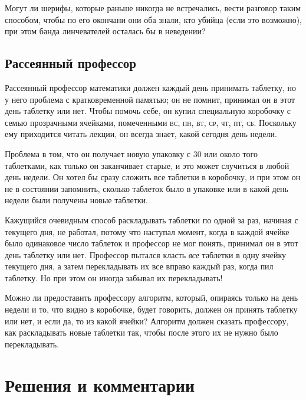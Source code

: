 \documentclass[twoside]{book}
\makeatletter
\newcommand{\rindex}[2][\imki@jobname]{%
  \index[#1]{\detokenize{#2}}%
}
\makeatother
\begin{document}
Могут ли шерифы, которые раньше никогда не встречались, вести разговор таким способом, чтобы по его окончани они оба знали, кто убийца (если это возможно),  при этом банда линчевателей осталась бы в неведении?

\subsection*{Рассеянный профессор}%
\rindex{Рассеянный профессор}

Рассеянный профессор математики должен каждый день принимать таблетку, но у него проблема с кратковременной памятью; он не помнит, принимал  он в этот день таблетку или нет.
Чтобы помочь себе, он купил специальную коробочку с семью прозрачными ячейками, помеченными \textsc{вс}, \textsc{пн}, \textsc{вт}, \textsc{ср}, \textsc{чт}, \textsc{пт}, \textsc{сб}.
Поскольку ему приходится читать лекции, он всегда знает, какой сегодня день недели.

Проблема в том, что он получает новую упаковку с 30 или около того таблетками, как только он заканчивает старые, и это может случиться в любой день недели.
Он хотел бы сразу сложить все таблетки в коробочку, и при этом он не в состоянии запомнить, сколько таблеток было в упаковке или в какой день недели были получены новые таблетки.

Кажущийся очевидным способ раскладывать таблетки по одной за раз, начиная с текущего дня, не работал, потому что наступал момент, когда в каждой ячейке было одинаковое число таблеток и профессор не мог понять, принимал  он в этот день таблетку или нет.
Профессор пытался класть \emph{все} таблетки в одну ячейку текущего дня, а затем перекладывать их все вправо каждый раз, когда пил таблетку.
Но при этом он иногда забывал их перекладывать!

Можно ли предоставить профессору алгоритм, который, опираясь только на день недели и то, что видно в коробочке,  будет говорить, должен  он принять таблетку или нет, и если да, то из какой ячейки?
Алгоритм должен сказать профессору, как раскладывать новые таблетки
так, чтобы после этого их не нужно было перекладывать.


 \section*{Решения и комментарии}
\end{document}

